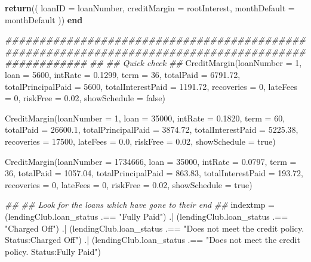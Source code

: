 \documentclass[11pt,]{report}
\newenvironment{Shaded}{\begin{snugshade}}{\end{snugshade}}
\newcommand{\CommentTok}[1]{\textcolor[rgb]{0.56,0.35,0.01}{\textit{#1}}}
\newcommand{\FloatTok}[1]{\textcolor[rgb]{0.00,0.00,0.81}{#1}}
\newcommand{\KeywordTok}[1]{\textcolor[rgb]{0.13,0.29,0.53}{\textbf{#1}}}
\newcommand{\NormalTok}[1]{#1}
\newcommand{\StringTok}[1]{\textcolor[rgb]{0.31,0.60,0.02}{#1}}
\begin{document}
\begin{Shaded}
\begin{Highlighting}[numbers=left,,]
{{  \KeywordTok{return}\NormalTok{((}
\NormalTok{    loanID = loanNumber,}
\NormalTok{    creditMargin = rootInterest,}
\NormalTok{    monthDefault = monthDefault}
\NormalTok{  ))}
\KeywordTok{end}


\CommentTok{####################################################################################################}
\CommentTok{##}
\CommentTok{## Quick check}
\CommentTok{##}
\NormalTok{CreditMargin(loanNumber = }\FloatTok{1}\NormalTok{, loan = }\FloatTok{5600}\NormalTok{, intRate = }\FloatTok{0.1299}\NormalTok{, term = }\FloatTok{36}\NormalTok{,}
\NormalTok{             totalPaid = }\FloatTok{6791.72}\NormalTok{, totalPrincipalPaid = }\FloatTok{5600}\NormalTok{, totalInterestPaid = }\FloatTok{1191.72}\NormalTok{,}
\NormalTok{             recoveries = }\FloatTok{0}\NormalTok{, lateFees = }\FloatTok{0}\NormalTok{,}
\NormalTok{             riskFree = }\FloatTok{0.02}\NormalTok{, showSchedule = false)}

\NormalTok{CreditMargin(loanNumber = }\FloatTok{1}\NormalTok{, loan = }\FloatTok{35000}\NormalTok{, intRate = }\FloatTok{0.1820}\NormalTok{, term = }\FloatTok{60}\NormalTok{,}
\NormalTok{             totalPaid = }\FloatTok{26600.1}\NormalTok{, totalPrincipalPaid = }\FloatTok{3874.72}\NormalTok{, totalInterestPaid = }\FloatTok{5225.38}\NormalTok{,}
\NormalTok{             recoveries = }\FloatTok{17500}\NormalTok{, lateFees = }\FloatTok{0.0}\NormalTok{,}
\NormalTok{             riskFree = }\FloatTok{0.02}\NormalTok{, showSchedule = true)}

\NormalTok{CreditMargin(loanNumber = }\FloatTok{1734666}\NormalTok{, loan = }\FloatTok{35000}\NormalTok{, intRate = }\FloatTok{0.0797}\NormalTok{, term = }\FloatTok{36}\NormalTok{,}
\NormalTok{             totalPaid = }\FloatTok{1057.04}\NormalTok{, totalPrincipalPaid = }\FloatTok{863.83}\NormalTok{, totalInterestPaid = }\FloatTok{193.72}\NormalTok{,}
\NormalTok{             recoveries = }\FloatTok{0}\NormalTok{, lateFees = }\FloatTok{0}\NormalTok{,}
\NormalTok{             riskFree = }\FloatTok{0.02}\NormalTok{, showSchedule = true)}


\CommentTok{##}
\CommentTok{## Look for the loans which have gone to their end}
\CommentTok{##}
\NormalTok{indextmp = (lendingClub.loan_status .== }\StringTok{"Fully Paid"}\NormalTok{) .|}
\NormalTok{           (lendingClub.loan_status .== }\StringTok{"Charged Off"}\NormalTok{) .|}
\NormalTok{           (lendingClub.loan_status .== }\StringTok{"Does not meet the credit policy. Status:Charged Off"}\NormalTok{) .|}
\NormalTok{           (lendingClub.loan_status .== }\StringTok{"Does not meet the credit policy. Status:Fully Paid"}\NormalTok{)}

}}
\end{Highlighting}
\end{Shaded}
\end{document}
